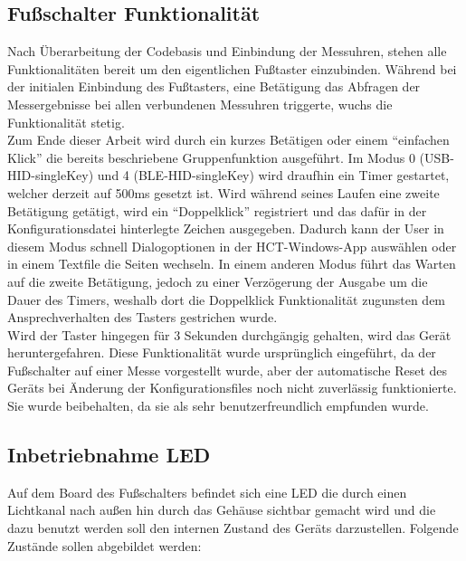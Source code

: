\subsection{Fußschalter Funktionalität}
Nach Überarbeitung der Codebasis und Einbindung der Messuhren, stehen alle Funktionalitäten bereit um den eigentlichen Fußtaster einzubinden. Während bei der initialen Einbindung des Fußtasters, eine Betätigung das Abfragen der Messergebnisse bei allen verbundenen Messuhren triggerte, wuchs die Funktionalität stetig.\\
Zum Ende dieser Arbeit wird durch ein kurzes Betätigen oder einem ``einfachen Klick'' die bereits beschriebene Gruppenfunktion ausgeführt. Im Modus 0 (USB-HID-singleKey) und 4 (BLE-HID-singleKey) wird draufhin ein Timer gestartet, welcher derzeit auf 500ms gesetzt ist. Wird während seines Laufen eine zweite Betätigung getätigt, wird ein ``Doppelklick'' registriert und das dafür in der Konfigurationsdatei hinterlegte Zeichen ausgegeben. Dadurch kann der User in diesem Modus schnell Dialogoptionen in der HCT-Windows-App auswählen oder in einem Textfile die Seiten wechseln. In einem anderen Modus führt das Warten auf die zweite Betätigung, jedoch zu einer Verzögerung der Ausgabe um die Dauer des Timers, weshalb dort die Doppelklick Funktionalität zugunsten dem Ansprechverhalten des Tasters gestrichen wurde.\\
Wird der Taster hingegen für 3 Sekunden durchgängig gehalten, wird das Gerät heruntergefahren. Diese Funktionalität wurde ursprünglich eingeführt, da der Fußschalter auf einer Messe vorgestellt wurde, aber der automatische Reset des Geräts bei Änderung der Konfigurationsfiles noch nicht zuverlässig funktionierte. Sie wurde beibehalten, da sie als sehr benutzerfreundlich empfunden wurde.

\subsection{Inbetriebnahme LED}
Auf dem Board des Fußschalters befindet sich eine LED die durch einen Lichtkanal nach außen hin durch das Gehäuse sichtbar gemacht wird und die dazu benutzt werden soll den internen Zustand des Geräts darzustellen. Folgende Zustände sollen abgebildet werden: 

